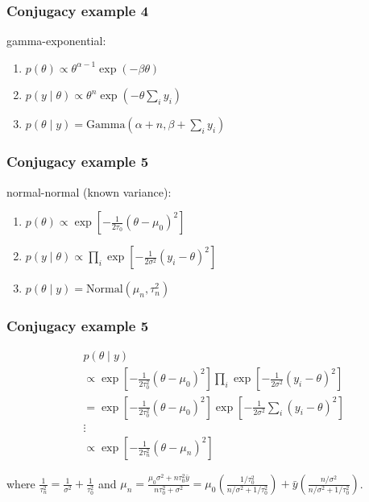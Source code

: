 \documentclass{beamer}
\begin{document}

\begin{frame}[fragile]
\frametitle{Conjugacy example 4}


gamma-exponential:
\begin{enumerate}
\item $p(\theta) \propto \theta^{\alpha - 1}\exp\left( - \beta \theta \right)$
\item $p(y \mid \theta) \propto \theta^n  \exp\left(- \theta \sum_i y_i\right)$
\item $p(\theta \mid y)  = \text{Gamma}(\alpha + n, \beta + \sum_i y_i)$
\end{enumerate}


\end{frame}


\begin{frame}[fragile]
\frametitle{Conjugacy example 5}


normal-normal (known variance):
\begin{enumerate}
\item $p(\theta) \propto \exp\left[-\frac{1}{2 \tau_0}(\theta - \mu_0)^2 \right]$
\item $p(y \mid \theta) \propto \prod_i \exp\left[-\frac{1}{2 \sigma^2} \left(y_i - \theta \right)^2 \right] $
\item $p(\theta \mid y) = \text{Normal}(\mu_n, \tau_n^2)$
\end{enumerate}


\end{frame}


\begin{frame}[fragile]
\frametitle{Conjugacy example 5}

\begin{align*}
&p(\theta \mid y) \\
&\propto \exp\left[-\frac{1}{2 \tau_0^2}(\theta - \mu_0)^2 \right] \prod_i \exp\left[-\frac{1}{2 \sigma^2} \left(y_i - \theta \right)^2 \right] \\
&= \exp\left[-\frac{1}{2 \tau_0^2}(\theta - \mu_0)^2 \right] \exp\left[-\frac{1}{2 \sigma^2} \sum_i \left(y_i - \theta \right)^2 \right] \\
&\vdots \tag{homework} \\
&\propto \exp\left[ - \frac{1}{2 \tau_n^2} (\theta - \mu_n)^2 \right]
\end{align*}

where $\frac{1}{\tau_n^2} = \frac{1}{\sigma^2} + \frac{1}{\tau_0^2}$ and $\mu_n = \frac{ \mu_0 \sigma^2 + n \tau_0^2 \bar{y}}{n \tau_0^2 + \sigma^2} = \mu_0 \left( \frac{ 1/\tau_0^2 }{n / \sigma^2 + 1/ \tau_0^2}\right) + \bar{y} \left(\frac{ n /\sigma^2}{n /\sigma^2 + 1/\tau_0^2}\right)$. 

\end{frame}
\end{document}
